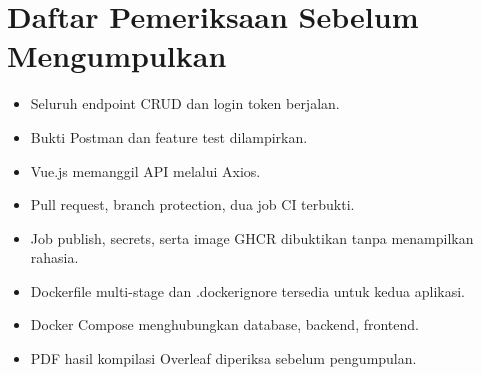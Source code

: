 \documentclass[12pt,a4paper]{report}
\begin{document}
\section{Daftar Pemeriksaan Sebelum Mengumpulkan}
\begin{itemize}
\item[$\square$] Seluruh endpoint CRUD dan login token berjalan.
\item[$\square$] Bukti Postman dan feature test dilampirkan.
\item[$\square$] Vue.js memanggil API melalui Axios.
\item[$\square$] Pull request, branch protection, dua job CI terbukti.
\item[$\square$] Job publish, secrets, serta image GHCR dibuktikan tanpa menampilkan rahasia.
\item[$\square$] Dockerfile multi-stage dan .dockerignore tersedia untuk kedua aplikasi.
\item[$\square$] Docker Compose menghubungkan database, backend, frontend.
\item[$\square$] PDF hasil kompilasi Overleaf diperiksa sebelum pengumpulan.
\end{itemize}
\end{document}
